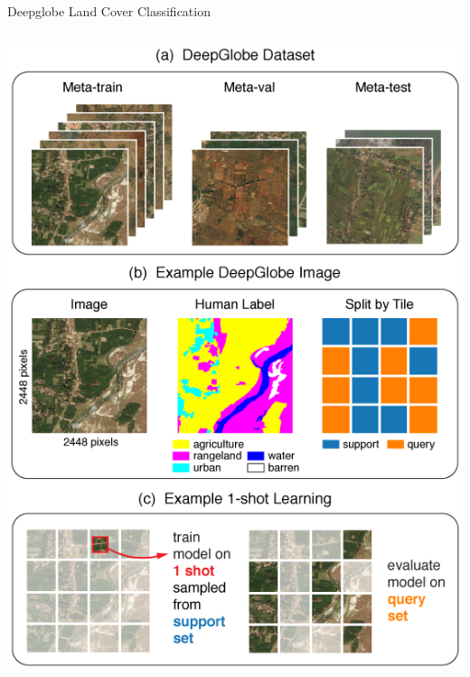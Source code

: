\documentclass[11pt]{beamer}
\begin{document}
	\begin{frame}{Deepglobe Land Cover Classification}
		\begin{columns}
			\includegraphics[width=\textwidth]{deepglobe/deepglobe_dataset}
			
\end{columns}
\end{frame}
\end{document}
